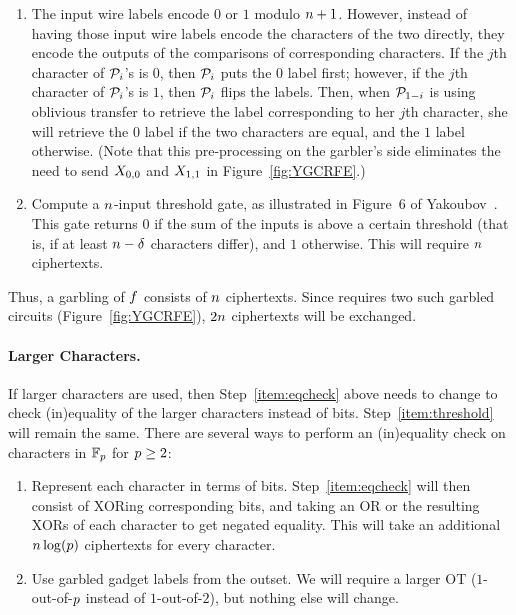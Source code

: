 \begin{enumerate}
\item
\label{item:eqcheck}
The input wire labels encode $0$ or $1$ modulo $n + 1$.
However, instead of having those input wire labels encode the characters of the two \passwords directly, they encode the outputs of the comparisons of corresponding characters.
If the $j$th character of $\mathcal{P}_{i}$'s \password is $0$, then $\mathcal{P}_{i}$ puts the $0$ label first; 
however, if the $j$th character of $\mathcal{P}_{i}$'s \password is $1$, then $\mathcal{P}_{i}$ flips the labels. 
Then, when $\mathcal{P}_{1-i}$ is using oblivious transfer to retrieve the label corresponding to her $j$th \password character, she will retrieve the $0$ label if the two characters are equal, and the $1$ label otherwise.
(Note that this pre-processing on the garbler's side eliminates the need to send $X_{0,0}$ and $X_{1,1}$ in Figure~\ref{fig:YGCRFE}.)
\item
\label{item:threshold}
Compute a $n$-input threshold gate, as illustrated in Figure~6 of Yakoubov~\cite{YGCintro}. %
This gate returns $0$ if the sum of the inputs is above a certain threshold (that is, if at least $n - \delta$ \password characters differ), and $1$ otherwise.
This will require $n$ ciphertexts.
\end{enumerate}

Thus, a garbling of $f$ consists of $n$ ciphertexts.
Since \FAKE requires two such garbled circuits (Figure~\ref{fig:YGCRFE}), $2n$ ciphertexts will be exchanged.



\paragraph{Larger \Password Characters.}

If larger \password characters are used, then Step~\ref{item:eqcheck} above needs to change to check (in)equality of the larger characters instead of bits.
Step~\ref{item:threshold} will remain the same.
There are several ways to perform an (in)equality check on characters in $\mathbb{F}_{p}$ for $p \geq 2$:
\begin{enumerate}
\item 
Represent each character in terms of bits.
Step~\ref{item:eqcheck} will then consist of XORing corresponding bits, and taking an OR or the resulting XORs of each character to get negated equality.
This will take an additional $n \log(p)$ ciphertexts for every \password character.
\item
Use garbled gadget labels from the outset. 
We will require a larger OT ($1$-out-of-$p$ instead of $1$-out-of-$2$), but nothing else will change.
\end{enumerate}
